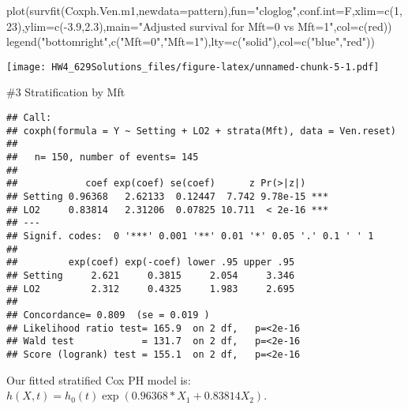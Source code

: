 \documentclass[
]{article}
\newenvironment{Shaded}{\begin{snugshade}}{\end{snugshade}}
\newcommand{\AttributeTok}[1]{\textcolor[rgb]{0.77,0.63,0.00}{#1}}
\newcommand{\CommentTok}[1]{\textcolor[rgb]{0.56,0.35,0.01}{\textit{#1}}}
\newcommand{\DecValTok}[1]{\textcolor[rgb]{0.00,0.00,0.81}{#1}}
\newcommand{\FloatTok}[1]{\textcolor[rgb]{0.00,0.00,0.81}{#1}}
\newcommand{\FunctionTok}[1]{\textcolor[rgb]{0.00,0.00,0.00}{#1}}
\newcommand{\NormalTok}[1]{#1}
\newcommand{\OtherTok}[1]{\textcolor[rgb]{0.56,0.35,0.01}{#1}}
\newcommand{\SpecialCharTok}[1]{\textcolor[rgb]{0.00,0.00,0.00}{#1}}
\newcommand{\StringTok}[1]{\textcolor[rgb]{0.31,0.60,0.02}{#1}}
\begin{document}
\begin{Shaded}
\begin{Highlighting}[]
\FunctionTok{plot}\NormalTok{(}\FunctionTok{survfit}\NormalTok{(Coxph.Ven.m1,}\AttributeTok{newdata=}\NormalTok{pattern),}\AttributeTok{fun=}\StringTok{"cloglog"}\NormalTok{,}\AttributeTok{conf.int=}\NormalTok{F,}\AttributeTok{xlim=}\FunctionTok{c}\NormalTok{(}\DecValTok{1}\NormalTok{,}\DecValTok{23}\NormalTok{),}\AttributeTok{ylim=}\FunctionTok{c}\NormalTok{(}\SpecialCharTok{{-}}\FloatTok{3.9}\NormalTok{,}\FloatTok{2.3}\NormalTok{),}\AttributeTok{main=}\StringTok{"Adjusted survival for Mft=0 vs Mft=1"}\NormalTok{,}\AttributeTok{col=}\FunctionTok{c}\NormalTok{(}\StringTok{\textquotesingle{}red\textquotesingle{}}\NormalTok{))}
\FunctionTok{legend}\NormalTok{(}\StringTok{"bottomright"}\NormalTok{,}\FunctionTok{c}\NormalTok{(}\StringTok{"Mft=0"}\NormalTok{,}\StringTok{"Mft=1"}\NormalTok{),}\AttributeTok{lty=}\FunctionTok{c}\NormalTok{(}\StringTok{"solid"}\NormalTok{),}\AttributeTok{col=}\FunctionTok{c}\NormalTok{(}\StringTok{"blue"}\NormalTok{,}\StringTok{"red"}\NormalTok{))}
\end{Highlighting}
\end{Shaded}

\texttt{[image: HW4\_629Solutions\_files/figure-latex/unnamed-chunk-5-1.pdf]}

\#3 Stratification by Mft

\begin{Shaded}
\end{Shaded}

\begin{verbatim}
## Call:
## coxph(formula = Y ~ Setting + LO2 + strata(Mft), data = Ven.reset)
## 
##   n= 150, number of events= 145 
## 
##            coef exp(coef) se(coef)      z Pr(>|z|)    
## Setting 0.96368   2.62133  0.12447  7.742 9.78e-15 ***
## LO2     0.83814   2.31206  0.07825 10.711  < 2e-16 ***
## ---
## Signif. codes:  0 '***' 0.001 '**' 0.01 '*' 0.05 '.' 0.1 ' ' 1
## 
##         exp(coef) exp(-coef) lower .95 upper .95
## Setting     2.621     0.3815     2.054     3.346
## LO2         2.312     0.4325     1.983     2.695
## 
## Concordance= 0.809  (se = 0.019 )
## Likelihood ratio test= 165.9  on 2 df,   p=<2e-16
## Wald test            = 131.7  on 2 df,   p=<2e-16
## Score (logrank) test = 155.1  on 2 df,   p=<2e-16
\end{verbatim}

Our fitted stratified Cox PH model is:
\(h(X,t)=h_0(t)\exp(0.96368*X_1+0.83814X_2)\).
\end{document}
